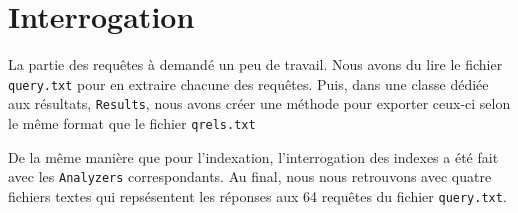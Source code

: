 \chapter{Interrogation}

La partie des requêtes à demandé un peu de travail. Nous avons du lire le fichier \texttt{query.txt} pour en extraire chacune des requêtes. Puis, dans une classe dédiée aux résultats, \texttt{Results}, nous avons créer une méthode pour exporter ceux-ci selon le même format que le fichier \texttt{qrels.txt}

De la même manière que pour l'indexation, l'interrogation des indexes a été fait avec les \texttt{Analyzers} correspondants. Au final, nous nous retrouvons avec quatre fichiers textes qui repsésentent les réponses aux 64 requêtes du fichier \texttt{query.txt}.